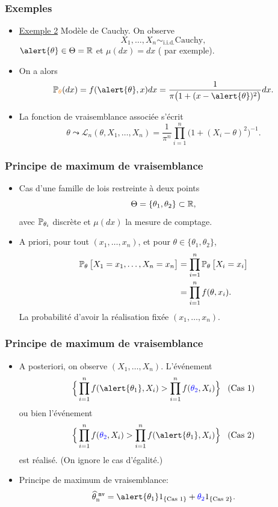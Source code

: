 \begin{frame}
\frametitle{Exemples}
\begin{itemize}
\item \underline{Exemple 2} \alert{Mod\`ele de Cauchy}. On observe
$$X_1,\ldots, X_n \sim_{\text{i.i.d.}}\text{Cauchy},$$
$\alert{\theta} \in \Theta = \R$ et $\mu(dx)=dx$ (\alert{ par exemple}).
\item On a alors
$$\PP_{\tco{\theta}}(dx)=f(\alert{\theta},x)dx=\frac{1}{\pi\big(1+(x-\alert{\theta})^2\big)}dx.$$
\item La \alert{ fonction de vraisemblance} associée s'écrit
$$\theta \leadsto {\mathcal L}_n(\theta, X_1,\ldots, X_n) = \frac{1}{\pi^n}\prod_{i = 1}^n \big(1+(X_i-\theta)^2\big)^{-1}.$$
\end{itemize}
\end{frame}

\begin{frame}
\frametitle{Principe de maximum de vraisemblance}
\begin{itemize}
\item Cas d'une famille de lois \alert{ restreinte à deux points}
$$\Theta  = \{\theta_1,\theta_2\} \subset \operatorname{{\mathbb R}},$$
avec $\operatorname{{\mathbb P}}_{\theta_i}$ discrète et $\mu(dx)$ la mesure de comptage.
\item \alert{A priori}, pour tout $(x_1,\ldots, x_n)$, et pour $\theta \in \{\theta_1,\theta_2\}$,
\begin{align*}
\operatorname{{\mathbb P}}_\theta\big[X_1=x_1,\ldots, X_n=x_n\big] & = \prod_{i=1}^n \operatorname{{\mathbb P}}_\theta\big[X_i=x_i\big] \\
&=\prod_{i = 1}^nf(\theta, x_i).
\end{align*}
La probabilit\'e d'avoir la r\'ealisation fix\'ee $(x_1,\ldots,
x_n)$.
\end{itemize}
\end{frame}

\begin{frame}
\frametitle{Principe de maximum de vraisemblance}
\begin{itemize}
\item \alert{A posteriori, on observe $(X_1,\ldots, X_n)$.} L'événement
$$\Big\{\prod_{i = 1}^n f(\alert{\theta_1},X_i) > \prod_{i = 1}^n f({\color{blue}\theta_2},X_i)\Big\}\;\;\;\text{(Cas 1)}$$
\alert{ou bien} l'événement
$$\Big\{\prod_{i = 1}^n f({\color{blue}\theta_2},X_i) > \prod_{i = 1}^n f(\alert{\theta_1},X_i)\Big\}\;\;\;\text{(Cas 2)}$$
est réalisé. (On ignore le cas d'égalité.)
\item \alert{ Principe de maximum de vraisemblance:}
$$\estMV = \alert{\theta_1} 1_{\{\text{Cas 1}\}}+ {\color{blue}\theta_2} 1_{\{\text{Cas 2}\}}.$$
\end{itemize}
\end{frame}

